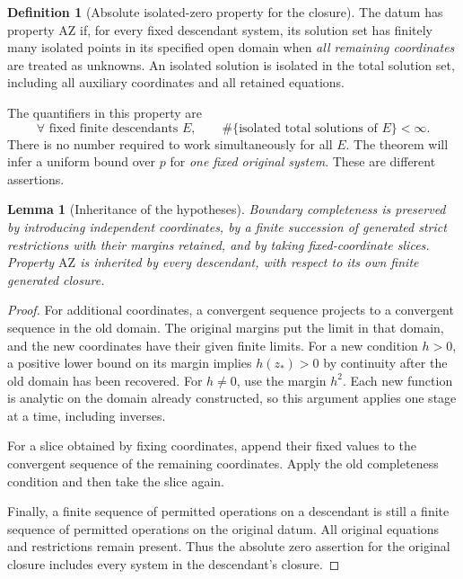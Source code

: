 \documentclass[11pt]{article}
\newtheorem{lemma}[theorem]{Lemma}
\theoremstyle{definition}
\newtheorem{definition}[theorem]{Definition}
\theoremstyle{remark}
\newcommand{\AZ}{\mathrm{AZ}}
\begin{document}
\begin{definition}[Absolute isolated-zero property for the closure]
\label{def:az}
The datum has property \(\AZ\) if, for every fixed descendant system,
its solution set has finitely many isolated points in its specified
open domain when \emph{all remaining coordinates} are treated as
unknowns. An isolated solution is isolated in the total solution set,
including all auxiliary coordinates and all retained equations.
\end{definition}

The quantifiers in this property are
\[
 \forall\text{ fixed finite descendants }E,\qquad
 \#\{\text{isolated total solutions of }E\}<\infty.
\]
There is no number required to work simultaneously for all \(E\).
The theorem will infer a uniform bound over \(p\) for \emph{one fixed
original system}. These are different assertions.

\begin{lemma}[Inheritance of the hypotheses]
\label{lem:inheritance}
Boundary completeness is preserved by introducing independent
coordinates, by a finite succession of generated strict restrictions
with their margins retained, and by taking fixed-coordinate slices.
Property \(\AZ\) is inherited by every descendant, with respect to
its own finite generated closure.
\end{lemma}

\begin{proof}
For additional coordinates, a convergent sequence projects to a
convergent sequence in the old domain. The original margins put the
limit in that domain, and the new coordinates have their given finite
limits. For a new condition \(h>0\), a positive lower bound on its
margin implies \(h(z_*)>0\) by continuity after the old domain has been
recovered. For \(h\ne0\), use the margin \(h^2\). Each new function is
analytic on the domain already constructed, so this argument applies
one stage at a time, including inverses.

For a slice obtained by fixing coordinates, append their fixed values
to the convergent sequence of the remaining coordinates. Apply the old
completeness condition and then take the slice again.

Finally, a finite sequence of permitted operations on a descendant is
still a finite sequence of permitted operations on the original datum.
All original equations and restrictions remain present. Thus the
absolute zero assertion for the original closure includes every system
in the descendant's closure.
\end{proof}
\end{document}
